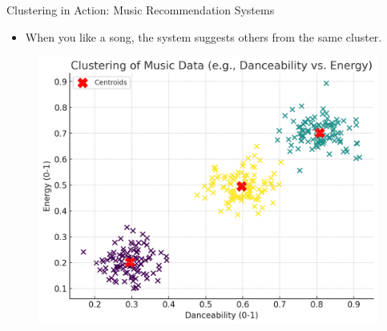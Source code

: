 \documentclass[serif, aspectratio=169]{beamer}
\begin{document}
\begin{frame}{Clustering in Action: Music Recommendation Systems }
\begin{itemize}
    \item When you like a song, the system suggests others from the same cluster.
    
\end{itemize}

    \begin{figure}
        \includegraphics[scale=0.4]{pic/figs/Music Clustering2.png}
        \centering
    \end{figure}

        
\end{frame}
\end{document}
